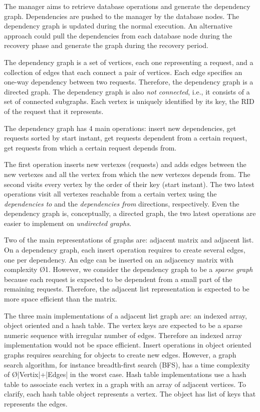 The manager aims to retrieve database operations and generate the dependency graph. Dependencies are pushed to the manager by the database nodes. The dependency graph is updated during the normal execution. An alternative approach could pull the dependencies from each database node during the recovery phase and generate the graph during the recovery period.

The dependency graph is a set of vertices, each one representing a request, and a collection of edges that each connect a pair of vertices. Each edge specifies an one-way dependency between two requests. Therefore, the dependency graph is a directed graph. The dependency graph is also \emph{not connected}, i.e., it consists of a set of connected subgraphs. Each vertex is uniquely identified by its key, the \ac{RID} of the request that it represents. 


The dependency graph has 4 main operations: insert new dependencies, get requests sorted by start instant, get requests dependent from a certain request, get requests from which a certain request depends from.

The first operation inserts new vertexes (requests) and adds edges between the new vertexes and all the vertex from which the new vertexes depends from. The second visits every vertex by the order of their key (start instant). The two latest operations visit all vertexes reachable from a certain vertex using the \emph{dependencies to} and the \emph{dependencies from} directions, respectively. Even the dependency graph is, conceptually, a directed graph, the two latest operations are easier to implement on \emph{undirected graphs}.

Two of the main representations of graphs are: adjacent matrix and adjacent list. On a dependency graph, each insert operation requires to create several edges, one per dependency. An edge can be inserted on an adjacency matrix with complexity \O{1}. However, we consider the dependency graph to be a \emph{sparse graph} because each request is expected to be dependent from a small part of the remaining requests. Therefore, the adjacent list representation is expected to be more space efficient than the matrix.

The three main implementations of a adjacent list graph are: an indexed array, object oriented and a hash table. The vertex keys are expected to be a sparse numeric sequence with irregular number of edges. Therefore an indexed array implementation would not be space efficient. Insert operations in object oriented graphs requires searching for objects to create new edges. However, a graph search algorithm, for instance breadth-first search (BFS), has a time complexity of \O{|Vertix|+|Edges|} in the worst case.
Hash table implementations use a hash table to associate each vertex in a graph with an array of adjacent vertices. To clarify, each hash table object represents a vertex. The object has list of keys that represents the edges. \\

